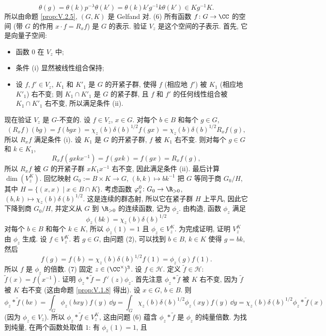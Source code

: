 \begin{solution}
\[
\theta(g) = \theta(k)p^{-\lambda}\theta(k') = \theta(k)k'g^{-1}k\theta(k') \in Kg^{-1}K.
\]
所以由命题 \ref{prop:V.2.5}, $(G, K)$ 是 Gelfand 对.
(6) 所有函数 $f \colon G \to \CC$ 的空间 (带 $G$ 的作用 $x \cdot f = R_xf$) 是 $G$ 的表示. 验证 $V_z$ 是这个空间的子表示. 首先, 它是向量子空间:
\begin{itemize}
\item 函数 $0$ 在 $V_z$ 中;
\item 条件 (i) 显然被线性组合保持;
\item 设 $f, f' \in V_z$, $K_1$ 和 $K'_1$ 是 $G$ 的开紧子群, 使得 $f$ (相应地 $f'$) 被 $K_1$ (相应地 $K'_1$) 右不变; 则 $K_1 \cap K'_1$ 是 $G$ 的紧子群, 且 $f$ 和 $f'$ 的任何线性组合被 $K_1 \cap K'_1$ 右不变, 所以满足条件 (ii).
\end{itemize}
现在验证 $V_z$ 是 $G$-不变的. 设 $f \in V_z$, $x \in G$. 对每个 $b \in B$ 和每个 $g \in G$,
\[
(R_xf)(bg) = f(bgx) = \chi_z(b)\delta(b)^{1/2}f(gx) = \chi_z(b)\delta(b)^{1/2}R_xf(g),
\]
所以 $R_xf$ 满足条件 (i). 设 $K_1$ 是 $G$ 的开紧子群, $f$ 被 $K_1$ 右不变. 则对每个 $g \in G$ 和 $k \in K_1$,
\[
R_xf(gxkx^{-1}) = f(gxk) = f(gx) = R_xf(g),
\]
所以 $R_xf$ 被 $G$ 的开紧子群 $xK_1x^{-1}$ 右不变, 因此满足条件 (ii).
最后计算 $\dim(V_z^K)$. 回忆映射 $G_0 := B \times K \to G$, $(b, k) \longmapsto bk^{-1}$ 把 $G$ 等同于商 $G_0/H$, 其中 $H = \{(x, x) \mid x \in B \cap K\}$. 考虑函数 $\varphi_z^0 \colon G_0 \to \R_{>0}$, $(b, k) \longmapsto \chi_z(b)\delta(b)^{1/2}$. 这是连续的群态射, 所以它在紧子群 $H$ 上平凡, 因此它下降到商 $G_0/H$, 并定义从 $G$ 到 $\R_{>0}$ 的连续函数, 记为 $\phi_z$. 由构造, 函数 $\phi_z$ 满足
\[
\phi_z(bk) = \chi_z(b)\delta(b)^{1/2}
\]
对每个 $b \in B$ 和每个 $k \in K$, 所以 $\phi_z(1) = 1$ 且 $\phi_z \in V_z^K$. 为完成证明, 证明 $V_z^K$ 由 $\phi_z$ 生成. 设 $f \in V_z^K$. 若 $g \in G$, 由问题 (2), 可以找到 $b \in B$, $k \in K$ 使得 $g = bk$, 然后
\[
f(g) = f(b) = \chi_z(b)\delta(b)^{1/2}f(1) = \phi_z(g)f(1).
\]
所以 $f$ 是 $\phi_z$ 的倍数.
(7) 固定 $z \in (\CC^{\times})^3$.
设 $f \in \mathcal{H}$. 定义 $\tilde{f} \in \mathcal{H}$: $\tilde{f}(x) = f(x^{-1})$. 证明 $\phi_z * \tilde{f} = f^{\vee}(z)\phi_z$. 首先注意 $\phi_z * \tilde{f}$ 被 $K$ 右不变, 因为 $\tilde{f}$ 被 $K$ 右不变 (这由命题 \ref{prop:V.1.8} 得出). 设 $x \in G$, $b \in B$. 则
\[
\phi_z * \tilde{f}(bx) = \int_G\phi_z(bxy)f(y)\,\dd y = \int_G\chi_z(b)\delta(b)^{1/2}\phi_z(xy)f(y)\,\dd y = \chi_z(b)\delta(b)^{1/2}\phi_z * \tilde{f}(x)
\]
(因为 $\phi_z \in V_z$). 所以 $\phi_z * \tilde{f} \in V_z^K$, 这由问题 (6) 蕴含 $\phi_z * \tilde{f}$ 是 $\phi_z$ 的纯量倍数. 为找到纯量, 在两个函数处取值 $1$: 有 $\phi_z(1) = 1$, 且

\end{solution}
